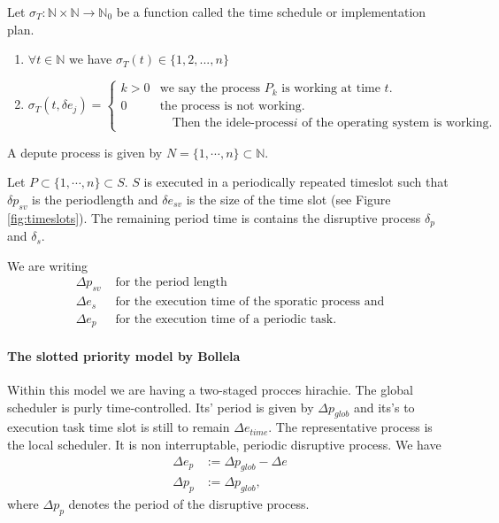 \begin{definition}
Let $\sigma_T: \mathbb{N} \times \mathbb{N} \rightarrow \mathbb{N}_0$ be a function called the time schedule or implementation plan.
\begin{enumerate}
\item $\forall t \in \mathbb{N}$ we have $\sigma_T(t)\in \{1,2,...,n\}$
\item \begin{equation}
		\sigma_T(t,\delta e_j) =
		\begin{cases}
			k > 0 & \text{we say the process $P_k$ is working at time $t$.}\\
			0 & \text{the process is not working.}\\
			  &\quad  \text{Then the idele-process$i$ of the operating system is working.}
		\end{cases}       
\end{equation}
\end{enumerate}
\end{definition}

A depute process is given by $ N = \{1, \cdots, n\}\subset \mathbb{N}$. 

Let $P \subset \{1, \cdots, n\} \subset S$.
$S$ is executed in a periodically repeated timeslot such that $\delta p_{sv}$ is the periodlength and $\delta e_{sv}$ is the size of the time slot (see Figure \ref{fig:timeslots}).
The remaining period time is contains the  disruptive process $\delta_p$ and $\delta_s$.

We are writing
\begin{align}
	\Delta p_{sv} &\text{ for the period length} \\
	\Delta e_s &\text{ for the execution time of the sporatic process and}\\ 
	\Delta e_p &\text{ for the execution time of a periodic task.}
\end{align}

\paragraph{The slotted priority model by Bollela}

Within this model we are having a two-staged procces hirachie. 
The global scheduler is purly time-controlled.
Its' period is given by $\Delta p_{glob}$ and its's to execution task time slot is still to remain $\Delta e_{time}$.
The representative process is the local scheduler. 
It is non interruptable, periodic disruptive process.
We have
\begin{align}
\Delta e_p &:= \Delta p_{glob} - \Delta e\\
\Delta p_{p} &:= \Delta p_{glob}, 
\end{align}
where $\Delta p_{p}$ denotes the period of the disruptive process.

